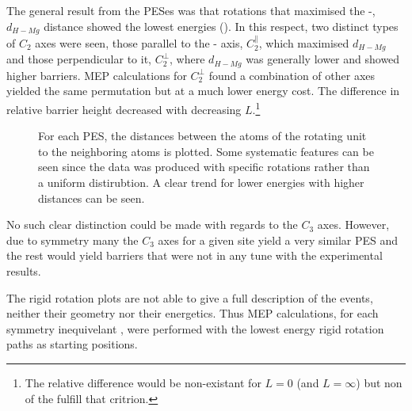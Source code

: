 The general result from the PESes was that rotations that maximised the -, $d_{H-Mg}$ distance showed the lowest energies ().
In this respect, two distinct types of $C_2$ axes were seen, those parallel to the - axis, $C_2^\parallel$, which maximised $d_{H-Mg}$ and those perpendicular to it, $C_2^\perp$, where $d_{H-Mg}$ was generally lower and showed higher barriers.
MEP calculations for $C_2^\perp$ found a combination of other axes yielded the same permutation but at a much lower energy cost.
The difference in relative barrier height decreased with decreasing $L$.\footnote{The relative difference would be non-existant for $L=0$ (and $L=\infty$) but non of the  fulfill that critrion.}

\begin{figure}[h]
\begin{center}
    \parbox{0.85\linewidth}{
      \caption{For each PES, the distances between the  atoms of the rotating  unit to the neighboring  atoms is plotted.
Some systematic features can be seen since the data was produced with specific rotations rather than a uniform distirubtion.
A clear trend for lower energies with higher distances can be seen.
      }
      \label{fig:h-mg-distances}
    }
\end{center}
\end{figure}

No such clear distinction could be made with regards to the $C_3$ axes.
However, due to symmetry many the $C_3$ axes for a given site yield a very similar PES and the rest would yield barriers that were not in any tune with the experimental results.

The rigid rotation plots are not able to give a full description of the events, neither their geometry nor their energetics.
Thus MEP calculations, for each symmetry inequivelant , were performed with the lowest energy rigid rotation paths as starting positions.

